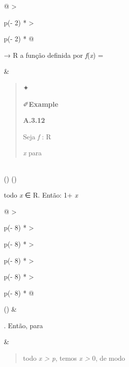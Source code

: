 \documentclass[
]{article}
\begin{document}
\begin{longtable}[]{@{}
  >{\raggedright\arraybackslash}p{(\columnwidth - 2\tabcolsep) * }
  >{\raggedright\arraybackslash}p{(\columnwidth - 2\tabcolsep) * }@{}}
\begin{minipage}[b]{\linewidth}
→ R a função definida por \emph{f}(\emph{x}) =\strut
\end{minipage} & \begin{minipage}[b]{\linewidth}\raggedright
\begin{quote}
✦

✐\textbf{Example}

\textbf{A.3.12}

Seja \emph{f} : R

\emph{x}\textbar{} \textbar{} para
\end{quote}
\end{minipage} \\
\midrule()
\endhead
\bottomrule()
\end{longtable}

todo \emph{x} ∈ R. Então: 1+ \emph{x}

\begin{longtable}[]{@{}
  >{\raggedright\arraybackslash}p{(\columnwidth - 8\tabcolsep) * }
  >{\raggedright\arraybackslash}p{(\columnwidth - 8\tabcolsep) * }
  >{\raggedright\arraybackslash}p{(\columnwidth - 8\tabcolsep) * }
  >{\raggedright\arraybackslash}p{(\columnwidth - 8\tabcolsep) * }
  >{\raggedright\arraybackslash}p{(\columnwidth - 8\tabcolsep) * }@{}}
\toprule()
 & \begin{minipage}[b]{\linewidth}\raggedright
. Então, para
\end{minipage} &
 \\
\begin{minipage}[b]{\linewidth}\raggedright
\begin{quote}
todo \emph{x \textgreater{} p}, temos \emph{x \textgreater{}} 0, de modo

\end{quote}
\end{minipage}
\end{longtable}
\end{document}
